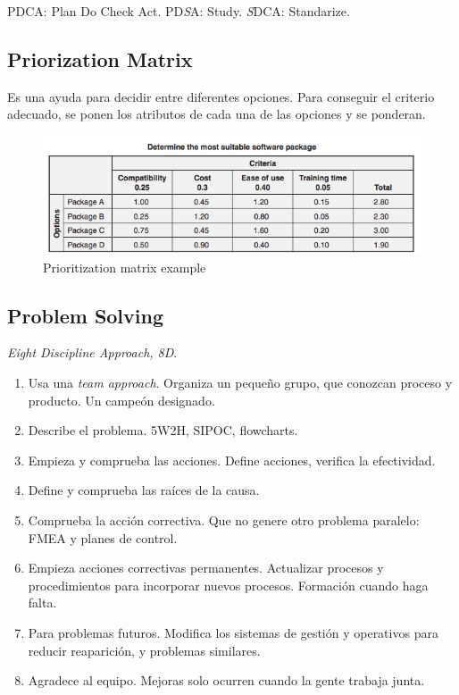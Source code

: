 \documentclass[]{article}
\begin{document}
PDCA: Plan Do Check Act. PD\textit{S}A: Study. \textit{S}DCA: Standarize.

\subsection{Priorization Matrix}

Es una ayuda para decidir entre diferentes opciones. Para conseguir el criterio adecuado, se ponen los atributos de cada una de las opciones y se ponderan.

\begin{figure}[ht!]
	\centering
	\includegraphics[width=120mm]{imagenes/Prioritizationmatrixexample.png}
	\caption{Prioritization matrix example}
	\label{fig:Prioritizationmatrixexample}
\end{figure}

\subsection{Problem Solving}

\textit{Eight Discipline Approach, 8D}. 

\begin{enumerate}
	\item Usa una \textit{team approach}. Organiza un pequeño grupo, que conozcan proceso y producto. Un campeón designado.
	\item Describe el problema. 5W2H, SIPOC, flowcharts.
	\item Empieza y comprueba las acciones. Define acciones, verifica la efectividad.
	\item Define y comprueba las raíces de la causa. 
	\item Comprueba la acción correctiva. Que no genere otro problema paralelo: FMEA y planes de control.
	\item Empieza acciones correctivas permanentes. Actualizar procesos y procedimientos para incorporar nuevos procesos. Formación cuando haga falta.
	\item Para problemas futuros. Modifica los sistemas de gestión y operativos para reducir reaparición, y problemas similares.
	\item Agradece al equipo. Mejoras solo ocurren cuando la gente trabaja junta.
\end{enumerate}
\end{document}
